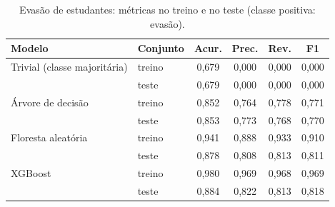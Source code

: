 \begin{table}[!t]
\centering
\caption{Evasão de estudantes: métricas no treino e no teste (classe positiva: evasão).}
\label{tab:estudantes_metricas}
\begin{tabular}{llcccc}
\hline
Modelo & Conjunto & Acur. & Prec. & Rev. & F1 \\
\hline
Trivial (classe majoritária) & treino & 0,679 & 0,000 & 0,000 & 0,000 \\
 & teste & 0,679 & 0,000 & 0,000 & 0,000 \\
Árvore de decisão & treino & 0,852 & 0,764 & 0,778 & 0,771 \\
 & teste & 0,853 & 0,773 & 0,768 & 0,770 \\
Floresta aleatória & treino & 0,941 & 0,888 & 0,933 & 0,910 \\
 & teste & 0,878 & 0,808 & 0,813 & 0,811 \\
XGBoost & treino & 0,980 & 0,969 & 0,968 & 0,969 \\
 & teste & 0,884 & 0,822 & 0,813 & 0,818 \\
\hline
\end{tabular}
\end{table}